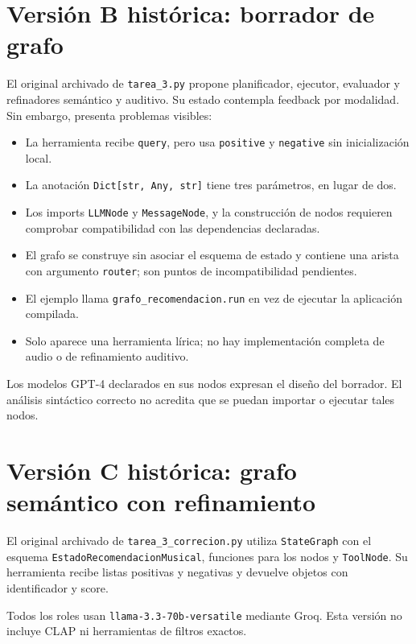 \documentclass[11pt,a4paper]{article}
\newcommand{\code}[1]{\nolinkurl{#1}}
\begin{document}
\section{Versión B histórica: borrador de grafo}
El original archivado de \code{tarea_3.py} propone planificador, ejecutor, evaluador y refinadores semántico y auditivo. Su estado contempla feedback por modalidad. Sin embargo, presenta problemas visibles:
\begin{itemize}
\item La herramienta recibe \code{query}, pero usa \code{positive} y \code{negative} sin inicialización local.
\item La anotación \code{Dict[str, Any, str]} tiene tres parámetros, en lugar de dos.
\item Los imports \code{LLMNode} y \code{MessageNode}, y la construcción de nodos requieren comprobar compatibilidad con las dependencias declaradas.
\item El grafo se construye sin asociar el esquema de estado y contiene una arista con argumento \code{router}; son puntos de incompatibilidad pendientes.
\item El ejemplo llama \code{grafo_recomendacion.run} en vez de ejecutar la aplicación compilada.
\item Solo aparece una herramienta lírica; no hay implementación completa de audio o de refinamiento auditivo.
\end{itemize}
Los modelos GPT-4 declarados en sus nodos expresan el diseño del borrador. El análisis sintáctico correcto no acredita que se puedan importar o ejecutar tales nodos.

\section{Versión C histórica: grafo semántico con refinamiento}
El original archivado de \code{tarea_3_correcion.py} utiliza \code{StateGraph} con el esquema \code{EstadoRecomendacionMusical}, funciones para los nodos y \code{ToolNode}. Su herramienta recibe listas positivas y negativas y devuelve objetos con identificador y score.
\begin{center}
\end{center}

Todos los roles usan \code{llama-3.3-70b-versatile} mediante Groq. Esta versión no incluye CLAP ni herramientas de filtros exactos.
\end{document}

